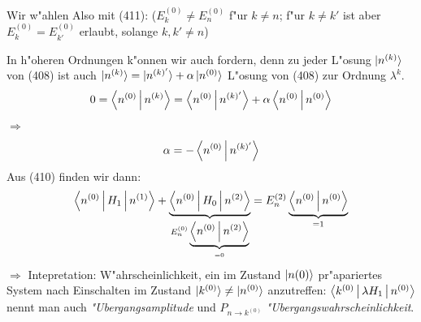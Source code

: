 \documentclass[a4paper]{scrartcl}
\begin{document}
Wir w"ahlen
Also mit (411):
($E_k^{(0)} \neq E_n^{(0)}$ f"ur $k \neq n$; f"ur $k \neq k'$ ist aber $E_k^{(0)} = E_{k'}^{(0)}$ erlaubt, solange $k, k' \neq n$)

In h"oheren Ordnungen k"onnen wir auch
fordern, denn zu jeder L"osung $\ket{ n^{(k)}}$ von (408) ist auch $\ket{ n^{(k)}} = \ket{n^{(k)'}} + \alpha \ket{ n^{(0)}}$ L"osung von (408) zur Ordnung $\lambda^k$.
$$0 = \Braket{ n^{(0)} | n^{(k)}} = \Braket{ n^{(0)} | n^{(k)'}} + \alpha \Braket{ n^{(0)} | n^{(0)}}$$
$\Longrightarrow$
$$\alpha  = - \Braket{ n^{(0)} | n^{(k)'}}$$
Aus (410) finden wir dann:
$$\Braket{ n^{(0)} | H_1 | n^{(1)}} + \underbrace{ \Braket{ n^{(0)} | H_0 | n^{(2)}}}_{E_n^{(0)} \underbrace{ \Braket{ n^{(0)} | n^{(2)}}}_{=0}} = E_n^{(2)} \underbrace{ \Braket{ n^{(0)} | n^{(0)}}}_{=1}$$
$\Longrightarrow$
Intepretation: W"ahrscheinlichkeit, ein im Zustand $\ket{n {(0)}}$ pr"apariertes System nach Einschalten im Zustand $\ket{ k^{(0)}} \neq \ket{n^{(0)}}$ anzutreffen:
$\Braket{ k^{(0)} | \lambda H_1 | n^{(0)}}$ nennt man auch \emph{"Ubergangsamplitude} und $P_{n \rightarrow k^{(0)}}$ \emph{"Ubergangswahrscheinlichkeit}.
\end{document}

